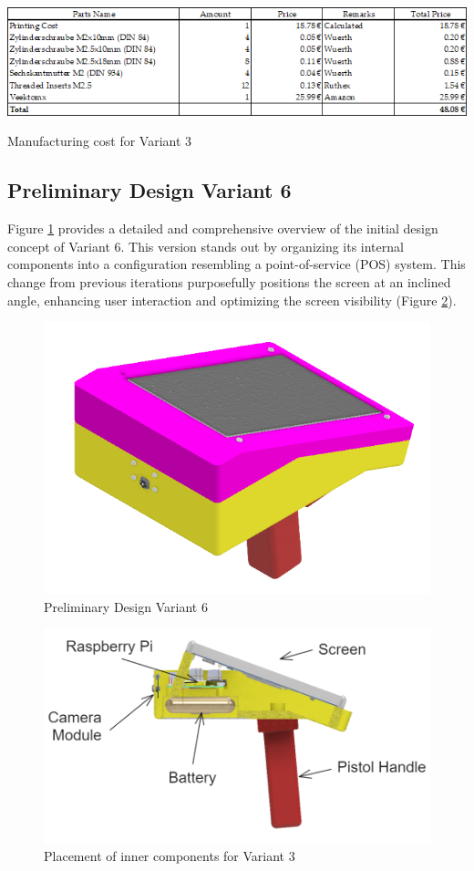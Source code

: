 \begin{table}[H]
    \centering
    \includegraphics[width=\linewidth]{texs/Part1/chapter3/image/v3manu.png}
    \caption{Manufacturing cost for Variant 3}
    \label{tab:manufacturing_cost_variant_3}
\end{table}

\subsection{Preliminary Design Variant 6}
\label{subsec:preliminary_design_variant_6}
Figure \ref{fig:preliminary_design_variant_6} provides a detailed and comprehensive overview of the initial design concept of Variant 6. This version stands out by organizing its internal components into a configuration resembling a point-of-service (POS) system. This change from previous iterations purposefully positions the screen at an inclined angle, enhancing user interaction and optimizing the screen visibility (Figure \ref{fig:variant6_inner_components}).

\begin{figure}[!ht]
    \centering
    \includegraphics[height=5 cm]{texs/Part1/chapter4/image/v61.png}
    \caption{Preliminary Design Variant 6}
    \label{fig:preliminary_design_variant_6}
\end{figure}

\begin{figure}[!ht]
    \centering
    \includegraphics[height=5 cm]{texs/Part1/chapter4/image/v62.png}
    \caption{Placement of inner components for Variant 3}
    \label{fig:variant6_inner_components}
\end{figure}

